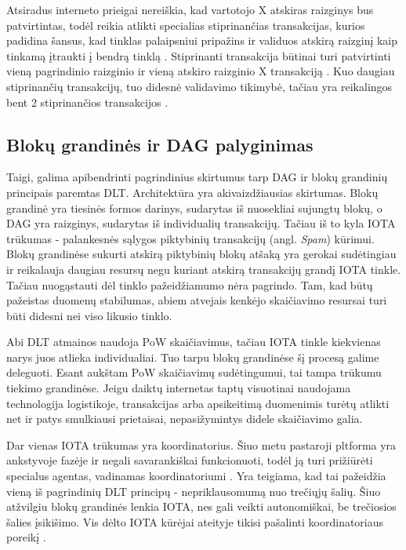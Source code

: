 Atsiradus interneto prieigai nereiškia, kad vartotojo X atskiras raizginys bus patvirtintas, todėl reikia atlikti specialias stiprinančias transakcijas, kurios padidina šansus, kad tinklas palaipsniui pripažins ir validuos atskirą raizginį kaip tinkamą įtraukti į bendrą tinklą \cite{bennet2017technical}. Stiprinanti transakcija būtinai turi patvirtinti vieną pagrindinio raizginio ir vieną atskiro raizginio X transakciją \cite{bennet2017technical}. Kuo daugiau stiprinančių transakcijų, tuo didesnė validavimo tikimybė, tačiau yra reikalingos bent 2 stiprinančios transakcijos \cite{bennet2017technical}.




\subsection{Blokų grandinės ir DAG palyginimas}

Taigi, galima apibendrinti pagrindinius skirtumus tarp DAG ir blokų grandinių principais paremtas DLT. Architektūra yra akivaizdžiausias skirtumas. Blokų grandinė yra tiesinės formos darinys, sudarytas iš nuosekliai sujungtų blokų, o DAG yra raizginys, sudarytas iš individualių transakcijų. Tačiau iš to kyla IOTA trūkumas - palankesnės sąlygos piktybinių transakcijų (angl. \textit{Spam}) kūrimui. Blokų grandinėse sukurti atskirą piktybinių blokų atšaką yra gerokai sudėtingiau ir reikalauja daugiau resursų negu kuriant atskirą transakcijų grandį IOTA tinkle. Tačiau nuogąstauti dėl tinklo pažeidžiamumo nėra pagrindo. Tam, kad būtų pažeistas duomenų stabilumas, abiem atvejais kenkėjo skaičiavimo resursai turi būti didesni nei viso likusio tinklo.

Abi DLT atmainos naudoja PoW skaičiavimus, tačiau IOTA tinkle kiekvienas narys juos atlieka individualiai. Tuo tarpu blokų grandinėse šį procesą galime deleguoti. Esant aukštam PoW skaičiavimų sudėtingumui, tai tampa trūkumu tiekimo grandinėse. Jeigu daiktų internetas taptų visuotinai naudojama technologija logistikoje, transakcijas arba apsikeitimą duomenimis turėtų atlikti net ir patys smulkiausi prietaisai, nepasižymintys didele skaičiavimo galia.

Dar vienas IOTA trūkumas yra koordinatorius. Šiuo metu pastaroji pltforma yra ankstyvoje fazėje ir negali savarankiškai funkcionuoti, todėl ją turi prižiūrėti specialus agentas, vadinamas koordinatoriumi \cite{bramas2018stability}. Yra teigiama, kad tai pažeidžia vieną iš pagrindinių DLT principų - nepriklausomumą nuo trečiųjų šalių. Šiuo atžvilgiu blokų grandinės lenkia IOTA, nes gali veikti autonomiškai, be trečiosios šalies įsikišimo. Vis dėlto IOTA kūrėjai ateityje tikisi pašalinti koordinatoriaus poreikį \cite{bramas2018stability}.

